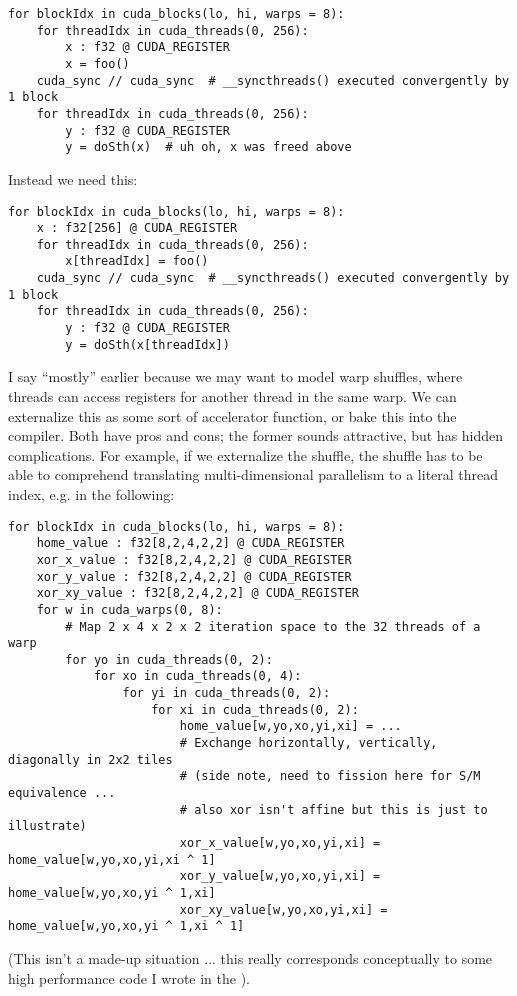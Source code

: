 \filbreak
{\color{lightttColor}
\begin{verbatim}
for blockIdx in cuda_blocks(lo, hi, warps = 8):
    for threadIdx in cuda_threads(0, 256):
        x : f32 @ CUDA_REGISTER
        x = foo()
    cuda_sync // cuda_sync  # __syncthreads() executed convergently by 1 block
    for threadIdx in cuda_threads(0, 256):
        y : f32 @ CUDA_REGISTER
        y = doSth(x)  # uh oh, x was freed above
\end{verbatim}
}

\filbreak
Instead we need this:
{\color{lightttColor}
\begin{verbatim}
for blockIdx in cuda_blocks(lo, hi, warps = 8):
    x : f32[256] @ CUDA_REGISTER
    for threadIdx in cuda_threads(0, 256):
        x[threadIdx] = foo()
    cuda_sync // cuda_sync  # __syncthreads() executed convergently by 1 block
    for threadIdx in cuda_threads(0, 256):
        y : f32 @ CUDA_REGISTER
        y = doSth(x[threadIdx])
\end{verbatim}
}

I say ``mostly'' earlier because we may want to model warp shuffles, where threads can access registers for another thread in the same warp.
We can externalize this as some sort of accelerator function, or bake this into the compiler.
Both have pros and cons; the former sounds attractive, but has hidden complications.
For example, if we externalize the shuffle, the shuffle has to be able to comprehend translating multi-dimensional parallelism to a literal thread index, e.g. in the following:

\filbreak
{\color{lightttColor}
\begin{verbatim}
for blockIdx in cuda_blocks(lo, hi, warps = 8):
    home_value : f32[8,2,4,2,2] @ CUDA_REGISTER
    xor_x_value : f32[8,2,4,2,2] @ CUDA_REGISTER
    xor_y_value : f32[8,2,4,2,2] @ CUDA_REGISTER
    xor_xy_value : f32[8,2,4,2,2] @ CUDA_REGISTER
    for w in cuda_warps(0, 8):
        # Map 2 x 4 x 2 x 2 iteration space to the 32 threads of a warp
        for yo in cuda_threads(0, 2):
            for xo in cuda_threads(0, 4):
                for yi in cuda_threads(0, 2):
                    for xi in cuda_threads(0, 2):
                        home_value[w,yo,xo,yi,xi] = ...
                        # Exchange horizontally, vertically, diagonally in 2x2 tiles
                        # (side note, need to fission here for S/M equivalence ...
                        # also xor isn't affine but this is just to illustrate)
                        xor_x_value[w,yo,xo,yi,xi] = home_value[w,yo,xo,yi,xi ^ 1]
                        xor_y_value[w,yo,xo,yi,xi] = home_value[w,yo,xo,yi ^ 1,xi]
                        xor_xy_value[w,yo,xo,yi,xi] = home_value[w,yo,xo,yi ^ 1,xi ^ 1]
\end{verbatim}
}
(This isn't a made-up situation ... this really corresponds conceptually to some high performance code I wrote in the ).

